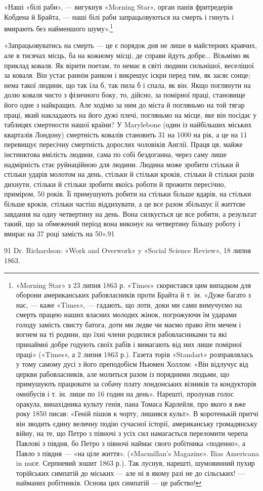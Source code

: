 «Наші «білі раби», — вигукнув «Morning Star», орган панів
фритредерів Кобдена й Брайта, — наші білі раби запрацьовуються
на смерть і гинуть і вмирають без найменшого шуму».\footnote{
«Morning Star» з 23 липня 1863 р. «Times» скористався цим випадком
для оборони американських рабовласників проти Брайта й т. ін.
«Дуже багато з нас, — каже «Times», — гадають, що лоти, доки ми сами
вимучуємо на смерть працею наших власних молодих жінок, погрожуючи
їм ударами голоду замість свисту батога, доти ми ледве чи маємо право
йти мечем і вогнем на ті родини, що їхні члени родилися рабовласниками
та які принаймні добре годують своїх рабів і вимагають від них лише
помірної праці» («Times», а 2 липня 1863 р.). Газета торів «Standart»
розправлялась у тому самому дусі з його преподобієм Ньюмен Холлом:
«Він відлучує від церкви рабовласників, але молиться разом із порядними
людьми, що примушують працювати за собачу плату лондонських візників
та кондукторів омнібусів і т. ін. лише по 16 годин на день». Нарешті,
пролунав голос оракула, винахідника культу генія, пана Томаса Карлейля,
про якого я вже року 1850 писав: «Геній пішов к чорту, лишився культ».
В коротенькій притчі він зводить єдину величну подію сучасної історії,
американську громадянську війну, на те, що Петро з півночі з усіх сил
намагається переломити черепа Павлові з півдня, бо Петро з півночі
наймає свого робітника «поденно», а Павло з півдня — «на ціле життя».
(«Macmillan’s Magazine». Ilias Americana in nuсе. Серпневий зошит
1863 р.). Так луснув, нарешті, шумовинний пухир торійських симпатій
до міських — але ні в якому разі не до сільських! — найманих робітників.
Основа цих симпатій — це рабство!
}

«Запрацьовуватись на смерть — це є порядок дня не лише
в майстернях кравчих, але в тисячах місць, ба на кожному місці,
де справи йдуть добре... Візьмімо як приклад коваля. Як вірити
поетам, то немає в світі людини сильнішої, веселішої за коваля.
Він устає раннім ранком і викрешує іскри перед тим, як засяє
сонце; нема такої людини, що так їла б, так пила б і спала, як
він. Якщо поглянути на долю коваля чисто з фізичного боку, то,
дійсно, за помірної праці, становище його одне з найкращих.
Але ходімо за ним до міста й погляньмо на той тягар праці, який
накладають на його дужі плечі, погляньмо на місце, яке він посідає
у таблицях смертности нашої країни? У Marylebone (один із
найбільших міських кварталів Лондону) смертність ковалів становить
31 на 1000 на рік, а це на 11 перевищує пересічну смертність
дорослих чоловіків Англії. Праця ця, майже інстинктова вмілість
людини, сама по собі бездоганна, через саму лише надмірність
стає руйнаційною для людини. Людина може зробити стільки й
стільки ударів молотом на день, стільки й стільки кроків, стільки
й стільки разів дихнути, стільки й стільки зробити якоїсь роботи
й прожити пересічно, приміром, 50 років. Її примушують робити
на стільки більше вдарів, на стільки більше кроків, стільки частіш
віддихувати, а це все разом збільшує її життєве завдання на
одну четвертину на день. Вона силкується це все робити, а результат
такий, що за обмежений період вона виконує на четвертину
більшу роботу і вмирає на 37 році замість на 50».91

91    Dr. Richardson: «Work and Overwork» y «Social Science Review»,
18 липня 1863.
